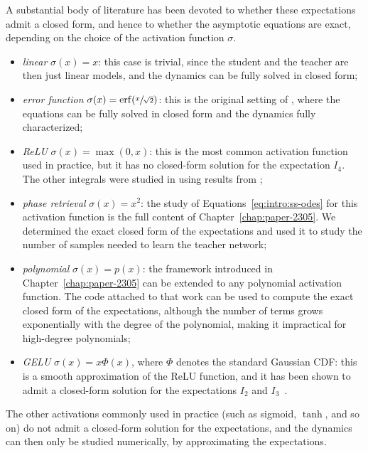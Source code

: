 A substantial body of literature has been devoted to whether these expectations admit a closed form, and hence to whether the asymptotic equations are exact, depending on the choice of the activation function \(\sigma\). 
\begin{itemize}
    \item \emph{linear} \(\sigma(x) = x\): this case is trivial, since the student and the teacher are then just linear models, and the dynamics can be fully solved in closed form;
    \item \emph{error function} \(\sigma(x) = \operatorname{erf}(\sfrac{x}{\sqrt{2}})\): this is the original setting of \citet{saad1995exact}, where the equations can be fully solved in closed form and the dynamics fully characterized;
    \item \emph{ReLU} \(\sigma(x) = \max(0, x)\): this is the most common activation function used in practice, but it has no closed-form solution for the expectation \(I_4\). The other integrals were studied in \citet{yoshida2019data} using results from \citet{yoshida2017statistical};
    \item \emph{phase retrieval} \(\sigma(x) = x^2\): the study of Equations~\eqref{eq:intro:ss-odes} for this activation function is the full content of Chapter~\ref{chap:paper-2305}. We determined the exact closed form of the expectations and used it to study the number of samples needed to learn the teacher network;
    \item \emph{polynomial} \(\sigma(x) = p(x)\): the framework introduced in Chapter~\ref{chap:paper-2305} can be extended to any polynomial activation function. The code attached to that work can be used to compute the exact closed form of the expectations, although the number of terms grows exponentially with the degree of the polynomial, making it impractical for high-degree polynomials;
    \item \emph{GELU} \(\sigma(x) = x \Phi(x)\), where \(\Phi\) denotes the standard Gaussian CDF: this is a smooth approximation of the ReLU function, and it has been shown to admit a closed-form solution for the expectations \(I_2\) and \(I_3\)~\cite{richert2023layered}.
\end{itemize}
The other activations commonly used in practice (such as sigmoid, \(\tanh\), and so on) do not admit a closed-form solution for the expectations, and the dynamics can then only be studied numerically, by approximating the expectations.
